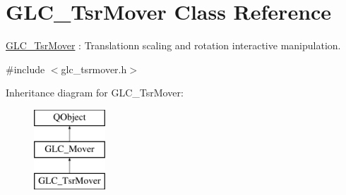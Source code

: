 \hypertarget{class_g_l_c___tsr_mover}{\section{G\-L\-C\-\_\-\-Tsr\-Mover Class Reference}
\label{class_g_l_c___tsr_mover}
}


\hyperlink{class_g_l_c___tsr_mover}{G\-L\-C\-\_\-\-Tsr\-Mover} \-: Translationn scaling and rotation interactive manipulation.  




{\ttfamily \#include $<$glc\-\_\-tsrmover.\-h$>$}

Inheritance diagram for G\-L\-C\-\_\-\-Tsr\-Mover\-:\begin{figure}[H]
\begin{center}
\leavevmode
\includegraphics[height=3.000000cm]{class_g_l_c___tsr_mover}
\end{center}
\end{figure}
